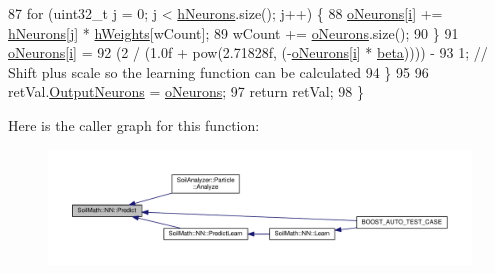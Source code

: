 \begin{DoxyCode}
87     \textcolor{keywordflow}{for} (uint32\_t \hyperlink{_comparision_pictures_2_createtest_image_8m_ac86694252f8dfdb19aaeadc4b7c342c6}{j} = 0; \hyperlink{_comparision_pictures_2_createtest_image_8m_ac86694252f8dfdb19aaeadc4b7c342c6}{j} < \hyperlink{class_soil_math_1_1_n_n_a459bde01ce33e0b27803cbe4a3b114b4}{hNeurons}.size(); \hyperlink{_comparision_pictures_2_createtest_image_8m_ac86694252f8dfdb19aaeadc4b7c342c6}{j}++) \{
88       \hyperlink{class_soil_math_1_1_n_n_a50a52b41982f6845dc5294f17607774b}{oNeurons}[\hyperlink{_comparision_pictures_2_createtest_image_8m_a6f6ccfcf58b31cb6412107d9d5281426}{i}] += \hyperlink{class_soil_math_1_1_n_n_a459bde01ce33e0b27803cbe4a3b114b4}{hNeurons}[\hyperlink{_comparision_pictures_2_createtest_image_8m_ac86694252f8dfdb19aaeadc4b7c342c6}{j}] * \hyperlink{class_soil_math_1_1_n_n_a46db1b2814215509a7345fccc8928efe}{hWeights}[wCount];
89       wCount += \hyperlink{class_soil_math_1_1_n_n_a50a52b41982f6845dc5294f17607774b}{oNeurons}.size();
90     \}
91     \hyperlink{class_soil_math_1_1_n_n_a50a52b41982f6845dc5294f17607774b}{oNeurons}[\hyperlink{_comparision_pictures_2_createtest_image_8m_a6f6ccfcf58b31cb6412107d9d5281426}{i}] =
92         (2 / (1.0f + pow(2.71828f, (-\hyperlink{class_soil_math_1_1_n_n_a50a52b41982f6845dc5294f17607774b}{oNeurons}[\hyperlink{_comparision_pictures_2_createtest_image_8m_a6f6ccfcf58b31cb6412107d9d5281426}{i}] * \hyperlink{class_soil_math_1_1_n_n_a4bb773955d78fa6f064b39a9149b78c8}{beta})))) -
93         1; \textcolor{comment}{// Shift plus scale so the learning function can be calculated}
94   \}
95 
96   retVal.\hyperlink{struct_predict__struct_aa0708cae93baa061f21452537e86d3bd}{OutputNeurons} = \hyperlink{class_soil_math_1_1_n_n_a50a52b41982f6845dc5294f17607774b}{oNeurons};
97   \textcolor{keywordflow}{return} retVal;
98 \}
\end{DoxyCode}


Here is the caller graph for this function\+:\nopagebreak
\begin{figure}[H]
\begin{center}
\leavevmode
\includegraphics[width=350pt]{class_soil_math_1_1_n_n_aa7f23fcdb8383a74586c9c30b8bc0af7_icgraph}
\end{center}
\end{figure}


